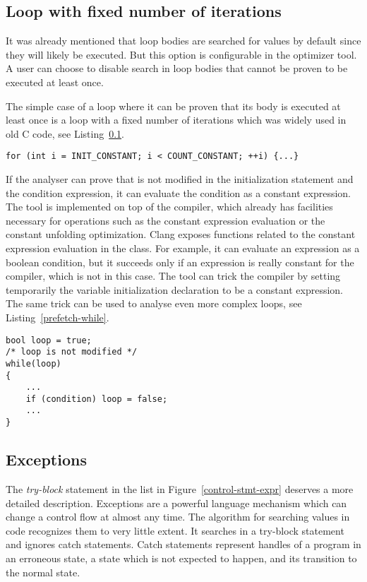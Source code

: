\subsection{Loop with fixed number of iterations}
\label{prefetch-for}
It was already mentioned that loop bodies are searched for values by default since they will likely be executed. But this option is configurable in the optimizer tool. A user can choose to disable search in loop bodies that cannot be proven to be executed at least once.

The simple case of a loop where it can be proven that its body is executed at least once is a  loop with a fixed number of iterations which was widely used in old C code, see Listing~\ref{prefetch-for}.

\begin{lstlisting}[caption={A \code{for} loop with a constant number of iterations.}, label={prefetch-for}]
for (int i = INIT_CONSTANT; i < COUNT_CONSTANT; ++i) {...}
\end{lstlisting}

If the analyser can prove that  is not modified in the initialization statement and the condition expression, it can evaluate the condition as a constant expression. The tool is implemented on top of the compiler, which already has facilities necessary for operations such as the constant expression evaluation or the constant unfolding optimization. Clang exposes functions related to the constant expression evaluation in the  class. For example, it can evaluate an expression as a boolean condition, but it succeeds only if an expression is really constant for the compiler, which is not in this case. The tool can trick the compiler by setting temporarily the variable initialization declaration to be a constant expression. The same trick can be used to analyse even more complex loops, see Listing~\ref{prefetch-while}.

\begin{lstlisting}[caption={An example of a more complex loop with at least one body execution.}, label={prefetch-while}, float=htpb]
bool loop = true;
/* loop is not modified */
while(loop)
{
    ...
    if (condition) loop = false;
    ...
}
\end{lstlisting}

\subsection{Exceptions}
The \emph{try-block} statement in the list in Figure~\ref{control-stmt-expr} deserves a more detailed description. Exceptions are a powerful language mechanism which can change a control flow at almost any time. The algorithm for searching values in code recognizes them to very little extent. It searches in a try-block statement and ignores catch statements. Catch statements represent handles of a program in an erroneous state, a state which is not expected to happen, and its transition to the normal state.

